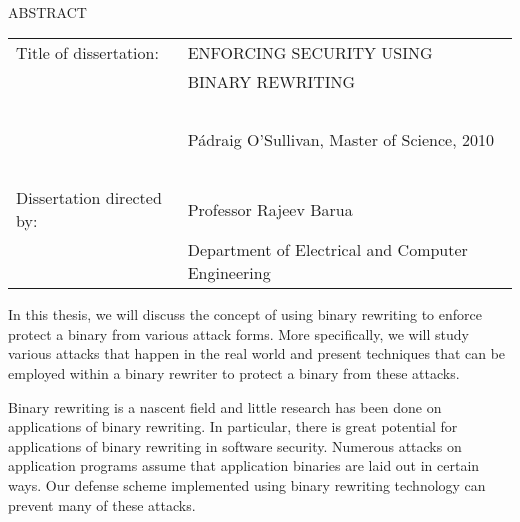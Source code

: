 
\hbox{\ }

\renewcommand{\baselinestretch}{1}
\small \normalsize

\begin{center}
\large{{ABSTRACT}} 

\vspace{3em} 

\end{center}
\hspace{-.15in}
\begin{tabular}{ll}
Title of dissertation:    & {\large  ENFORCING SECURITY USING}\\
&				      {\large  BINARY REWRITING} \\
\ \\
&                          {\large  P\'{a}draig O'Sullivan, Master of Science, 2010} \\
\ \\
Dissertation directed by: & {\large  Professor Rajeev Barua} \\
&  				{\large	 Department of Electrical and Computer Engineering} \\
\end{tabular}

\vspace{3em}

\renewcommand{\baselinestretch}{2}
\large \normalsize

In this thesis, we will discuss the concept of using binary rewriting to enforce protect a binary
from various attack forms. More specifically, we will study various attacks that happen in the real
world and present techniques that can be employed within a binary rewriter to protect a binary from
these attacks.

Binary rewriting is a nascent field and little research has been done on applications of binary
rewriting. In particular, there is great potential for applications of binary rewriting in software
security. Numerous attacks on application programs assume that application binaries are laid out in
certain ways. Our defense scheme implemented using binary rewriting technology can prevent many of
these attacks. 

